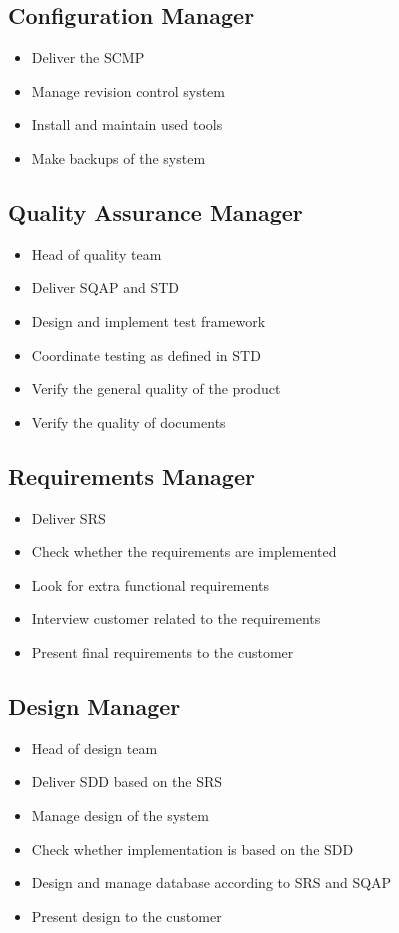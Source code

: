 \documentclass[a4paper, 12pt]{report}
\begin{document}
		\subsection{Configuration Manager}
			\begin{itemize}
				\item Deliver the SCMP
				\item Manage revision control system
				\item Install and maintain used tools
				\item Make backups of the system
			\end{itemize}
			
		\subsection{Quality Assurance Manager}
			\begin{itemize}
					\item Head of quality team
					\item Deliver SQAP and STD
					\item Design and implement test framework
					\item Coordinate testing as defined in STD
					\item Verify the general quality of the product
					\item Verify the quality of documents
			\end{itemize}
			
		\subsection{Requirements Manager}
			\begin{itemize}
				\item Deliver SRS
				\item Check whether the requirements are implemented
				\item Look for extra functional requirements
				\item Interview customer related to the requirements
				\item Present final requirements to the customer
			\end{itemize}
			
		\subsection{Design Manager}	
			\begin{itemize}
				\item Head of design team
				\item Deliver SDD based on the SRS
				\item Manage design of the system
				\item Check whether implementation is based on the SDD
				\item Design and manage database according to SRS and SQAP
				\item Present design to the customer
			\end{itemize}	
			
\end{document}
